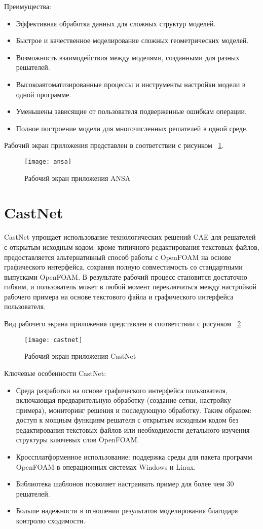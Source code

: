 \documentclass[14pt]{extreport}
\begin{document}
Преимущества: 
\begin{itemize}
\item Эффективная обработка данных для сложных структур моделей.
\item Быстрое и качественное моделирование сложных геометрических моделей.
\item Возможность взаимодействия между моделями, созданными для разных решателей.
\item Высокоавтоматизированные процессы и инструменты настройки модели в одной программе.
\item Уменьшены зависящие от пользователя подверженные ошибкам операции.
\item Полное построение модели для многочисленных решателей в одной среде.
\end{itemize}
Рабочий экран приложения представлен в соответствии с рисунком ~\ref{fig3}.

\begin{figure}[H]
\centerline{\texttt{[image: ansa]}}
\caption{Рабочий экран приложения ANSA}
\label{fig3}
\end{figure}

\section{CastNet}

CastNet упрощает использование технологических решений CAE для решателей с открытым исходным кодом: кроме типичного редактирования текстовых файлов, предоставляется альтернативный способ работы с OpenFOAM на основе графического интерфейса, сохраняя полную совместимость со стандартными выпусками OpenFOAM. В результате рабочий процесс становится достаточно гибким, и пользователь может в любой момент переключаться между настройкой рабочего примера на основе текстового файла и графического интерфейса пользователя.

Вид рабочего экрана приложения представлен в соответствии с рисунком ~\ref{fig4}
\begin{figure}[H]
\centerline{\texttt{[image: castnet]}}
\caption{Рабочий экран приложения CastNet}
\label{fig4}
\end{figure}

Ключевые особенности CastNet:
\begin{itemize}
\item Среда разработки на основе графического интерфейса пользователя, включающая предварительную обработку (создание сетки, настройку примера), мониторинг решения и последующую обработку. Таким образом: доступ к мощным функциям решателя с открытым исходным кодом без редактирования текстовых файлов или необходимости детального изучения структуры ключевых слов OpenFOAM.
\item Кроссплатформенное использование: поддержка среды для пакета программ OpenFOAM в операционных системах Windows и Linux.
\item Библиотека шаблонов позволяет настраивать пример для более чем 30 решателей.
\item Больше надежности в отношении результатов моделирования благодаря контролю сходимости.
\end{itemize}
\end{document}
